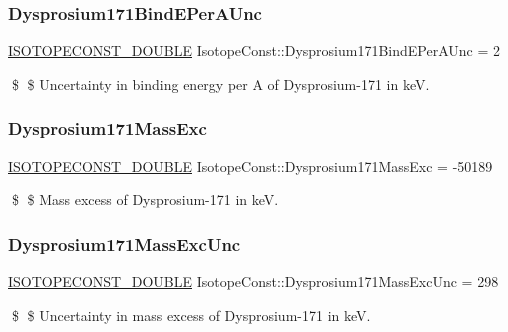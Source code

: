 \subsubsection{\texorpdfstring{Dysprosium171\+Bind\+E\+Per\+A\+Unc}{Dysprosium171BindEPerAUnc}}
{\footnotesize\ttfamily \mbox{\hyperlink{group___isotope_const-_macros_ga8f45a7272ce02c0b4c65c44636ed719a}{I\+S\+O\+T\+O\+P\+E\+C\+O\+N\+S\+T\+\_\+\+D\+O\+U\+B\+LE}} Isotope\+Const\+::\+Dysprosium171\+Bind\+E\+Per\+A\+Unc = 2}

\$ \$ Uncertainty in binding energy per A of Dysprosium-\/171 in keV. \mbox{\label{group___isotope_const-_dysprosium-_dy171_gae6b4960b96add4d6b9cf2449b8ae58ad}} 
\subsubsection{\texorpdfstring{Dysprosium171\+Mass\+Exc}{Dysprosium171MassExc}}
{\footnotesize\ttfamily \mbox{\hyperlink{group___isotope_const-_macros_ga8f45a7272ce02c0b4c65c44636ed719a}{I\+S\+O\+T\+O\+P\+E\+C\+O\+N\+S\+T\+\_\+\+D\+O\+U\+B\+LE}} Isotope\+Const\+::\+Dysprosium171\+Mass\+Exc = -\/50189}

\$ \$ Mass excess of Dysprosium-\/171 in keV. \mbox{\label{group___isotope_const-_dysprosium-_dy171_ga6ae61955f233a50b9fa7587c39c529cf}} 
\subsubsection{\texorpdfstring{Dysprosium171\+Mass\+Exc\+Unc}{Dysprosium171MassExcUnc}}
{\footnotesize\ttfamily \mbox{\hyperlink{group___isotope_const-_macros_ga8f45a7272ce02c0b4c65c44636ed719a}{I\+S\+O\+T\+O\+P\+E\+C\+O\+N\+S\+T\+\_\+\+D\+O\+U\+B\+LE}} Isotope\+Const\+::\+Dysprosium171\+Mass\+Exc\+Unc = 298}

\$ \$ Uncertainty in mass excess of Dysprosium-\/171 in keV. \mbox{\label{group___isotope_const-_dysprosium-_dy171_gae2e4396d60152ffcf77a91fb98de72d9}} 
